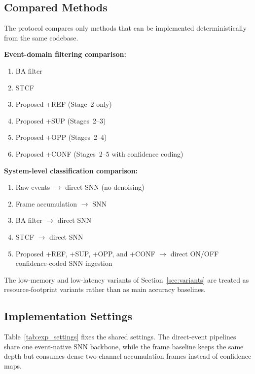 \documentclass[a4paper,fleqn]{cas-dc}
\begin{document}
\subsection{Compared Methods}

The protocol compares only methods that can be implemented deterministically from the same codebase.

\textbf{Event-domain filtering comparison:}
\begin{enumerate}
    \item BA filter~\citep{delbruck2008ba}
    \item STCF~\citep{khodamoradi2018onoise}
    \item Proposed +REF (Stage~2 only)
    \item Proposed +SUP (Stages~2--3)
    \item Proposed +OPP (Stages~2--4)
    \item Proposed +CONF (Stages~2--5 with confidence coding)
\end{enumerate}

\textbf{System-level classification comparison:}
\begin{enumerate}
    \item Raw events $\rightarrow$ direct SNN (no denoising)
    \item Frame accumulation $\rightarrow$ SNN
    \item BA filter $\rightarrow$ direct SNN
    \item STCF $\rightarrow$ direct SNN
    \item Proposed +REF, +SUP, +OPP, and +CONF $\rightarrow$ direct ON/OFF confidence-coded SNN ingestion
\end{enumerate}

The low-memory and low-latency variants of Section~\ref{sec:variants} are treated as resource-footprint variants rather than as main accuracy baselines.

\subsection{Implementation Settings}

Table~\ref{tab:exp_settings} fixes the shared settings. The direct-event pipelines share one event-native SNN backbone, while the frame baseline keeps the same depth but consumes dense two-channel accumulation frames instead of confidence maps.
\end{document}
